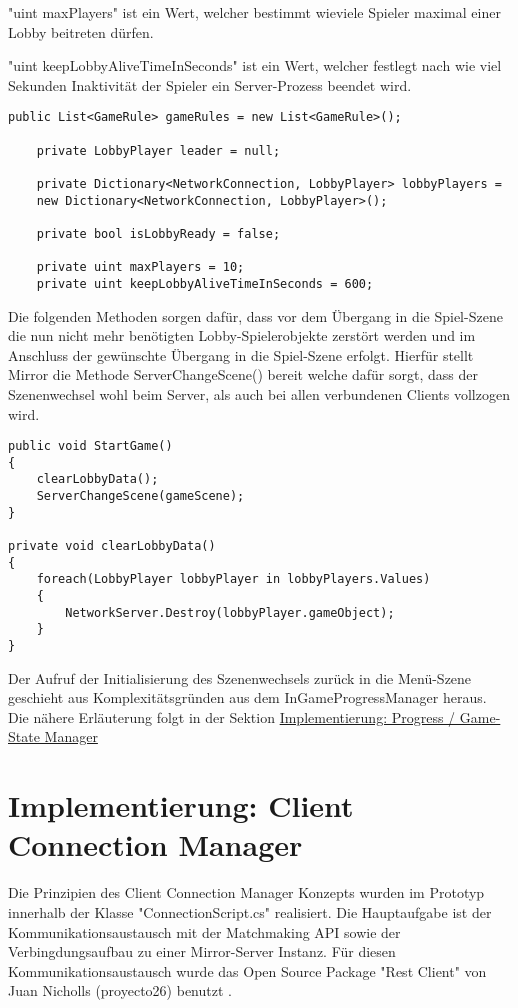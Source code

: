 "uint maxPlayers" ist ein Wert, welcher bestimmt wieviele Spieler maximal einer Lobby beitreten dürfen.

"uint keepLobbyAliveTimeInSeconds" ist ein Wert, welcher festlegt nach wie viel Sekunden Inaktivität der Spieler ein Server-Prozess beendet wird.

\begin{lstlisting}[caption= GameNetworkManager.cs Lobby Variables]
	public List<GameRule> gameRules = new List<GameRule>();
	
	private LobbyPlayer leader = null;
	
	private Dictionary<NetworkConnection, LobbyPlayer> lobbyPlayers = 
	new Dictionary<NetworkConnection, LobbyPlayer>();
	
	private bool isLobbyReady = false;
	
	private uint maxPlayers = 10;
	private uint keepLobbyAliveTimeInSeconds = 600;
\end{lstlisting}

Die folgenden Methoden sorgen dafür, dass vor dem Übergang in die Spiel-Szene die nun nicht mehr benötigten Lobby-Spielerobjekte zerstört werden und im Anschluss der gewünschte Übergang in die Spiel-Szene erfolgt. Hierfür stellt Mirror die Methode ServerChangeScene() bereit welche dafür sorgt, dass der Szenenwechsel wohl beim Server, als auch bei allen verbundenen Clients vollzogen wird.

\begin{lstlisting}[caption= GameNetworkManager.cs StartGame]
public void StartGame()
{
	clearLobbyData();
	ServerChangeScene(gameScene);
}

private void clearLobbyData()
{
	foreach(LobbyPlayer lobbyPlayer in lobbyPlayers.Values)
	{
		NetworkServer.Destroy(lobbyPlayer.gameObject);
	}
}
\end{lstlisting}

Der Aufruf der Initialisierung des Szenenwechsels zurück in die Menü-Szene geschieht aus Komplexitätsgründen aus dem InGameProgressManager heraus. Die nähere Erläuterung folgt in der Sektion \hyperref[Progress Manager]{Implementierung: Progress / Game-State Manager}

\section{Implementierung: Client Connection Manager}

Die Prinzipien des Client Connection Manager Konzepts wurden im Prototyp innerhalb der Klasse "ConnectionScript.cs" realisiert. Die Hauptaufgabe ist der Kommunikationsaustausch mit der Matchmaking API sowie der Verbingdungsaufbau zu einer Mirror-Server Instanz. Für diesen Kommunikationsaustausch wurde das Open Source Package "Rest Client" von Juan Nicholls (proyecto26) benutzt \cite{GitHub.10.02.2022}.


